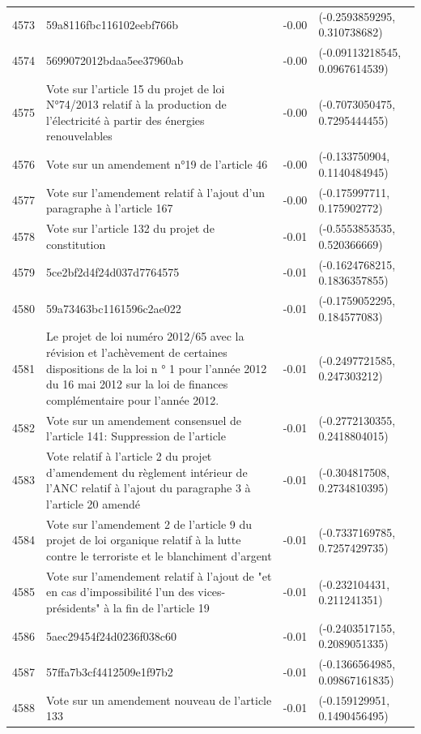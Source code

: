 \begin{table}[ht]
\begin{tabular}{rlrl}
  4573 & 59a8116fbc116102eebf766b & -0.00 & (-0.2593859295, 0.310738682) \\ 
  4574 & 5699072012bdaa5ee37960ab & -0.00 & (-0.09113218545, 0.0967614539) \\ 
  4575 & Vote sur l'article 15 du projet de loi N°74/2013 relatif à la production de l'électricité à partir des énergies renouvelables & -0.00 & (-0.7073050475, 0.7295444455) \\ 
  4576 & Vote sur un amendement n°19 de l'article 46 & -0.00 & (-0.133750904, 0.1140484945) \\ 
  4577 & Vote sur l'amendement relatif à l'ajout d'un paragraphe à l'article 167 & -0.00 & (-0.175997711, 0.175902772) \\ 
  4578 & Vote sur l'article 132 du projet de constitution & -0.01 & (-0.5553853535, 0.520366669) \\ 
  4579 & 5ce2bf2d4f24d037d7764575 & -0.01 & (-0.1624768215, 0.1836357855) \\ 
  4580 & 59a73463bc1161596c2ae022 & -0.01 & (-0.1759052295, 0.184577083) \\ 
  4581 & Le projet de loi numéro 2012/65 avec la révision et l'achèvement de certaines dispositions de la loi n ° 1 pour l'année 2012 du 16 mai 2012 sur la loi de finances complémentaire pour l'année 2012. & -0.01 & (-0.2497721585, 0.247303212) \\ 
  4582 & Vote sur un amendement consensuel de l'article 141: Suppression de l'article & -0.01 & (-0.2772130355, 0.2418804015) \\ 
  4583 & Vote relatif à l'article 2 du projet d'amendement du règlement intérieur de l'ANC relatif à l'ajout du paragraphe 3 à l'article 20 amendé & -0.01 & (-0.304817508, 0.2734810395) \\ 
  4584 & Vote sur l'amendement 2 de l'article 9 du projet de loi organique relatif à la lutte contre le terroriste et le blanchiment d'argent & -0.01 & (-0.7337169785, 0.7257429735) \\ 
  4585 & Vote sur l'amendement relatif à l'ajout de "et en cas d'impossibilité l'un des vices-présidents" à la fin de l'article 19 & -0.01 & (-0.232104431, 0.211241351) \\ 
  4586 & 5aec29454f24d0236f038c60 & -0.01 & (-0.2403517155, 0.2089051335) \\ 
  4587 & 57ffa7b3cf4412509e1f97b2 & -0.01 & (-0.1366564985, 0.09867161835) \\ 
  4588 & Vote sur un amendement nouveau de l'article 133 & -0.01 & (-0.159129951, 0.1490456495) \\ 

\end{tabular}
\end{table}
